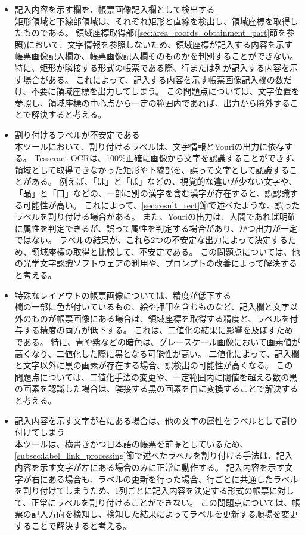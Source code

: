 \begin{itemize}
    \item 記入内容を示す欄を、帳票画像記入欄として検出する\\
        矩形領域と下線部領域は、それぞれ矩形と直線を検出し、領域座標を取得したものである。
        領域座標取得部(\ref{sec:area_coords_obtainment_part}節を参照)において、文字情報を参照しないため、領域座標が記入する内容を示す帳票画像記入欄か、帳票画像記入欄そのものかを判別することができない。
        特に、矩形が隣接する形式の帳票である際、行または列が記入する内容を示す場合がある。
        これによって、記入する内容を示す帳票画像記入欄の数だけ、不要に領域座標を出力してしまう。
        この問題点については、文字位置を参照し、領域座標の中心点から一定の範囲内であれば、出力から除外することで解決すると考える。
    \item 割り付けるラベルが不安定である\\
        本ツールにおいて、割り付けるラベルは、文字情報とYouriの出力に依存する。
        Tesseract-OCRは、100\%正確に画像から文字を認識することができず、領域として取得できなかった矩形や下線部を、誤って文字として認識することがある。
        例えば、「は」と「ば」などの、視覚的な違いが少ない文字や、「品」と「口」などの、一部に別の漢字を含む漢字が存在すると、誤認識する可能性が高い。
        これによって、\ref{sec:result_rect}節で述べたような、誤ったラベルを割り付ける場合がある。
        また、Youriの出力は、人間であれば明確に属性を判定できるが、誤って属性を判定する場合があり、かつ出力が一定ではない。
        ラベルの結果が、これら2つの不安定な出力によって決定するため、領域座標の取得と比較して、不安定である。 
        この問題点については、他の光学文字認識ソフトウェアの利用や、プロンプトの改善によって解決すると考える。
    \item 特殊なレイアウトの帳票画像については、精度が低下する\\
        欄の一部に色が付いているもの、絵や押印を含むものなど、記入欄と文字以外のものが帳票画像にある場合は、領域座標を取得する精度と、ラベルを付与する精度の両方が低下する。
        これは、二値化の結果に影響を及ぼすためである。
        特に、青や紫などの暗色は、グレースケール画像において画素値が高くなり、二値化した際に黒となる可能性が高い。
        二値化によって、記入欄と文字以外に黒の画素が存在する場合、誤検出の可能性が高くなる。
        この問題点については、二値化手法の変更や、一定範囲内に閾値を超える数の黒の画素を認識した場合は、隣接する黒の画素を白に変換することで解決すると考える。
    \item 記入内容を示す文字が右にある場合は、他の文字の属性をラベルとして割り付けてしまう\\
        本ツールは、横書きかつ日本語の帳票を前提としているため、\ref{subsec:label_link_processing}節で述べたラベルを割り付ける手法は、記入内容を示す文字が左にある場合のみに正常に動作する。
        記入内容を示す文字が右にある場合も、ラベルの更新を行った場合、行ごとに共通したラベルを割り付けてしまうため、1列ごとに記入内容を決定する形式の帳票に対して、正常にラベルを割り付けることができない。
        この問題点については、帳票の記入方向を検知し、検知した結果によってラベルを更新する順場を変更することで解決すると考える。
\end{itemize}